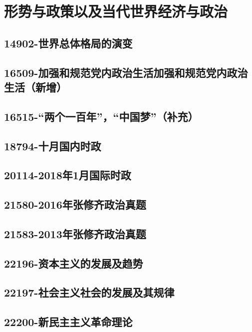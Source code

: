 \section{形势与政策以及当代世界经济与政治}


\subsection{14902-世界总体格局的演变}

\subsection{16509-加强和规范党内政治生活加强和规范党内政治生活（新增）}

\subsection{16515-“两个一百年”，“中国梦”（补充）}

\subsection{18794-十月国内时政}

\subsection{20114-2018年1月国际时政}

\subsection{21580-2016年张修齐政治真题}

\subsection{21583-2013年张修齐政治真题}

\subsection{22196-资本主义的发展及趋势}

\subsection{22197-社会主义社会的发展及其规律}

\subsection{22200-新民主主义革命理论}

